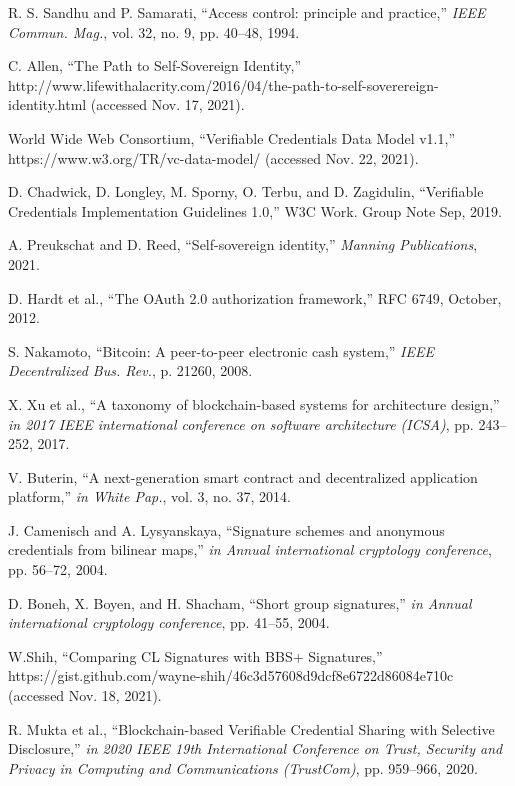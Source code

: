 \documentclass[conference, dvipdfmx]{IEEEtran} %
\begin{document}
\begin{sloppypar}
\begin{thebibliography}{00}
    R. S. Sandhu and P. Samarati, ``Access control: principle and practice,'' {\em IEEE Commun. Mag.}, vol. 32, no. 9, pp. 40–48, 1994.
  
    C. Allen, ``The Path to Self-Sovereign Identity,'' http://www.lifewithalacrity.com/2016/04/the-path-to-self-soverereign-identity.html (accessed Nov. 17, 2021).
  
    World Wide Web Consortium, ``Verifiable Credentials Data Model v1.1,'' https://www.w3.org/TR/vc-data-model/ (accessed Nov. 22, 2021).
  
    D. Chadwick, D. Longley, M. Sporny, O. Terbu, and D. Zagidulin, ``Verifiable Credentials Implementation Guidelines 1.0,'' W3C Work. Group Note Sep, 2019.
  
    A. Preukschat and D. Reed, ``Self-sovereign identity,'' {\em Manning Publications}, 2021.
  
    D. Hardt et al., ``The OAuth 2.0 authorization framework,'' RFC 6749, October, 2012.
  
    S. Nakamoto, ``Bitcoin: A peer-to-peer electronic cash system,'' {\em IEEE Decentralized Bus. Rev.}, p. 21260, 2008.
  
    X. Xu et al., ``A taxonomy of blockchain-based systems for architecture design,'' {\em in 2017 IEEE international conference on software architecture (ICSA)}, pp. 243–252, 2017.
  
    V. Buterin, ``A next-generation smart contract and decentralized application platform,'' {\em in White Pap.}, vol. 3, no. 37, 2014.
  
    J. Camenisch and A. Lysyanskaya, ``Signature schemes and anonymous credentials from bilinear maps,'' {\em in Annual international cryptology conference}, pp. 56–72, 2004.
  
    D. Boneh, X. Boyen, and H. Shacham, ``Short group signatures,'' {\em in Annual international cryptology conference}, pp. 41–55, 2004.
  
    W.Shih, ``Comparing CL Signatures with BBS+ Signatures,'' https://gist.github.com/wayne-shih/46c3d57608d9dcf8e6722d86084e710c (accessed Nov. 18, 2021).
  
    R. Mukta et al., ``Blockchain-based Verifiable Credential Sharing with Selective Disclosure,'' {\em in 2020 IEEE 19th International Conference on Trust, Security and Privacy in Computing and Communications (TrustCom)}, pp. 959–966, 2020.


\end{thebibliography}
\end{sloppypar}
\end{document}
